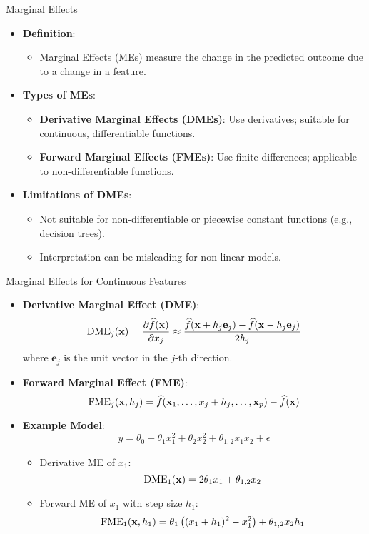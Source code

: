 \documentclass[10pt,compress,t,notes=noshow, xcolor=table]{beamer}
\begin{document}
\begin{frame}{Marginal Effects}
\begin{itemize}
\item \textbf{Definition}:
\begin{itemize}
  \item Marginal Effects (MEs) measure the change in the predicted outcome due to a change in a feature.
\end{itemize}
\item \textbf{Types of MEs}:
\begin{itemize}
  \item \textbf{Derivative Marginal Effects (DMEs)}: Use derivatives; suitable for continuous, differentiable functions.
  \item \textbf{Forward Marginal Effects (FMEs)}: Use finite differences; applicable to non-differentiable functions.
\end{itemize}
\item \textbf{Limitations of DMEs}:
\begin{itemize}
  \item Not suitable for non-differentiable or piecewise constant functions (e.g., decision trees).
  \item Interpretation can be misleading for non-linear models.
\end{itemize}
\end{itemize}
\end{frame}

\begin{frame}{Marginal Effects for Continuous Features}
\begin{itemize}
\item \textbf{Derivative Marginal Effect (DME)}:
\[
\text{DME}_j(\mathbf{x}) = \frac{\partial \widehat{f}(\mathbf{x})}{\partial x_j} \approx \frac{\widehat{f}(\mathbf{x} + h_j \mathbf{e}_j) - \widehat{f}(\mathbf{x} - h_j \mathbf{e}_j)}{2h_j}
\]
where $\mathbf{e}_j$ is the unit vector in the $j$-th direction.
\item \textbf{Forward Marginal Effect (FME)}:
\[
\text{FME}_j(\mathbf{x}, h_j) = \widehat{f}(\mathbf{x}_1, \dots, x_j + h_j, \dots, \mathbf{x}_p) - \widehat{f}(\mathbf{x})
\]
\item \textbf{Example Model}:
\[
y = \theta_0 + \theta_{1} x_1^2 + \theta_{2} x_2^2 + \theta_{1,2} x_1 x_2 + \epsilon
\]
\begin{itemize}
\item Derivative ME of $x_1$:
\[
\text{DME}_1(\mathbf{x}) = 2\theta_1 x_1 + \theta_{1,2} x_2
\]
\item Forward ME of $x_1$ with step size $h_1$:
\[
\text{FME}_1(\mathbf{x}, h_1) = \theta_1 \left( (x_1 + h_1)^2 - x_1^2 \right) + \theta_{1,2} x_2 h_1
\]
\end{itemize}
\end{itemize}
\end{frame}
\end{document}
